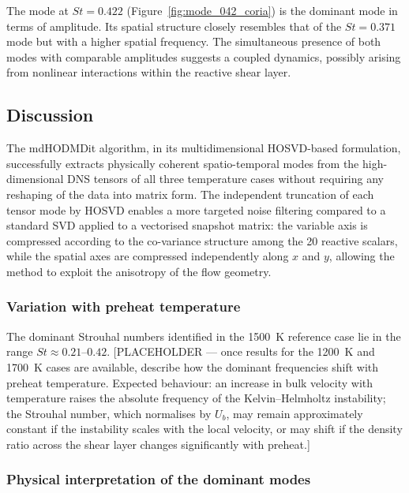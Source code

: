 The mode at $St = 0.422$ (Figure~\ref{fig:mode_042_coria}) is the dominant mode in
terms of amplitude.
Its spatial structure closely resembles that of the $St = 0.371$ mode but with a higher
spatial frequency.
The simultaneous presence of both modes with comparable amplitudes suggests a coupled
dynamics, possibly arising from nonlinear interactions within the reactive shear layer.

\subsection{Discussion}
\label{sec:discussion_mdhodmd}

The mdHODMDit algorithm, in its multidimensional HOSVD-based formulation, successfully
extracts physically coherent spatio-temporal modes from the high-dimensional DNS tensors
of all three temperature cases without requiring any reshaping of the data into matrix
form.
The independent truncation of each tensor mode by HOSVD enables a more targeted noise
filtering compared to a standard SVD applied to a vectorised snapshot matrix: the
variable axis is compressed according to the co-variance structure among the 20 reactive
scalars, while the spatial axes are compressed independently along $x$ and $y$, allowing
the method to exploit the anisotropy of the flow geometry.

\subsubsection*{Variation with preheat temperature}

The dominant Strouhal numbers identified in the 1500~K reference case lie in the range
$St \approx 0.21$--$0.42$.
[PLACEHOLDER — once results for the 1200~K and 1700~K cases are available, describe
how the dominant frequencies shift with preheat temperature.
Expected behaviour: an increase in bulk velocity with temperature raises the absolute
frequency of the Kelvin--Helmholtz instability; the Strouhal number, which normalises
by $U_b$, may remain approximately constant if the instability scales with the local
velocity, or may shift if the density ratio across the shear layer changes significantly
with preheat.]

\subsubsection*{Physical interpretation of the dominant modes}


